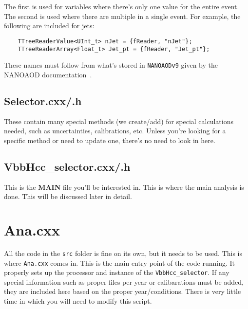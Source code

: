 The first is used for variables where there's only one value for the entire event. The second is used where there are multiple in a single event. For example, the following are included for jets:

\begin{verbatim}
    TTreeReaderValue<UInt_t> nJet = {fReader, "nJet"};
    TTreeReaderArray<Float_t> Jet_pt = {fReader, "Jet_pt"};
\end{verbatim}

\noindent These names must follow from what's stored in \verb|NANOAODv9| given by the NANOAOD documentation~\cite{nanoaod_doc}.


\subsection{Selector.cxx/.h}
These contain many special methods (we create/add) for special calculations needed, such as uncertainties, calibrations, etc. Unless you're looking for a specific method or need to update one, there's no need to look in here.

\subsection{VbbHcc\_selector.cxx/.h}
This is the \textbf{MAIN} file you'll be interested in. This is where the main analysis is done. This will be discussed later in detail.

\section{Ana.cxx}
All the code in the \verb|src| folder is fine on its own, but it needs to be used. This is where \verb|Ana.cxx| comes in. This is the main entry point of the code running. It properly sets up the processor and instance of the \verb|VbbHcc_selector|. If any special information such as proper files per year or calibarations must be added, they are included here based on the proper year/conditions. There is very little time in which you will need to modify this script.